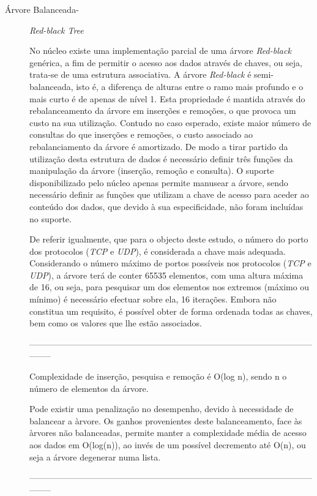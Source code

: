 \begin{description}

\item[Árvore Balanceada- ]
\textit{Red-black Tree} 

No núcleo existe uma implementação parcial de uma árvore \textit{Red-black} genérica, a fim de permitir o acesso aos dados através de chaves, ou seja, trata-se de uma estrutura associativa.\cite{}
A árvore \textit{Red-black} é semi-balanceada, isto é, a diferença de alturas entre o ramo mais profundo e o mais curto é de apenas de nível 1.
Esta propriedade é mantida através do rebalanceamento da árvore em inserções e remoções, o que provoca um custo na sua utilização.
Contudo no caso esperado, existe maior número de consultas do que inserções e remoções, o custo associado ao rebalanciamento da árvore é amortizado.
De modo a tirar partido da utilização desta estrutura de dados é necessário definir três funções da manipulação da árvore (inserção, remoção e consulta).
O suporte disponibilizado pelo núcleo apenas permite manusear a árvore, sendo necessário definir as funções que utilizam a chave de acesso para aceder ao conteúdo dos dados, que devido à sua especificidade, não foram incluídas no suporte.

De referir igualmente, que para o objecto deste estudo, o número do porto dos protocolos (\textit{TCP} e \textit{UDP}), é considerada a chave mais adequada.
Considerando o número máximo de portos possíveis nos protocolos (\textit{TCP} e \textit{UDP}), a árvore terá de conter 65535 elementos, com uma altura máxima de 16, ou seja, para pesquisar um dos elementos nos extremos (máximo ou mínimo) é necessário efectuar sobre ela, 16 iterações.
Embora não constitua um requisito, é possível obter de forma ordenada todas as chaves, bem como os valores que lhe estão associados.

-----------------------------------------------------------------------------------------------------------

Complexidade de inserção, pesquisa e remoção é O(log n), sendo n o número de elementos da árvore.

Pode existir uma penalização no desempenho, devido à necessidade de balancear a àrvore.
Os ganhos provenientes deste balanceamento, face às àrvores não balanceadas, permite manter a complexidade média de acesso aos dados em O(log(n)), ao invés de um possível decremento até O(n), ou seja a árvore degenerar numa lista.

-----------------------------------------------------------------------------------------------------------


\end{description}


